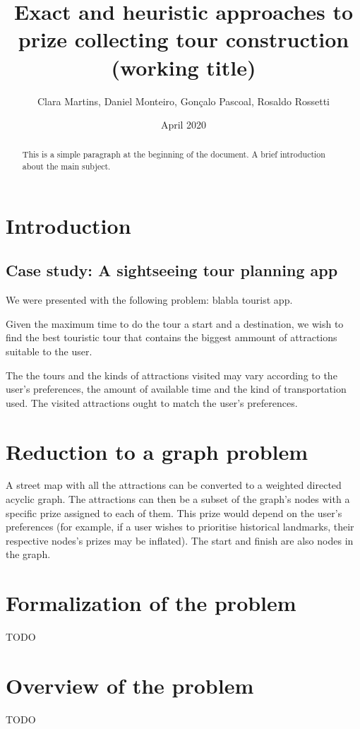 \documentclass{article}
\title{Exact and heuristic approaches to prize collecting tour construction (working title)}
\author{Clara Martins, Daniel Monteiro, Gonçalo Pascoal, Rosaldo Rossetti}
\date{April 2020}
\begin{document}
\maketitle

\begin{abstract}
This is a simple paragraph at the beginning of the 
document. A brief introduction about the main subject.
\end{abstract}

\section{Introduction}

\subsection{Case study: A sightseeing tour planning app}
We were presented with the following problem: blabla tourist app. 

Given the maximum time to do the tour a start and a destination, we wish to find the best touristic tour that contains the biggest ammount of attractions suitable to the user.

The the tours and the kinds of attractions visited may vary according to the user's preferences, the amount of available time and the kind of transportation used. The visited attractions ought to match the user's preferences.

\section{Reduction to a graph problem}

A street map with all the attractions can be converted to a weighted directed acyclic graph. The attractions can then be a subset of the graph's nodes with a specific prize assigned to each of them. This prize would depend on the user's preferences (for example, if a user wishes to prioritise historical landmarks, their respective nodes's prizes may be inflated). The start and finish are also nodes in the graph. 

\section{Formalization of the problem}

TODO

\section{Overview of the problem}

TODO
\end{document}
